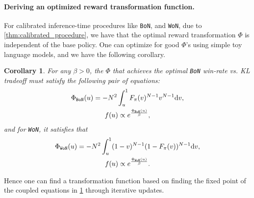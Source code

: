\documentclass{article}
\newcommand{\dd}{{\rm d}}
\newcommand{\reg}{\beta}
\newtheorem{corollary}{Corollary}
\newcommand{\bofn}{\texttt{BoN}\xspace}
\newcommand{\wofn}{\texttt{WoN}\xspace}
\begin{document}
%

%



%

%

\paragraph{Deriving an optimized reward transformation function.} %
For calibrated inference-time procedures like \bofn, and \wofn, due to \cref{thm:calibrated_procedure}, we have that the optimal reward transformation $\Phi$ is independent of the base policy. One can optimize for good $\Phi$'s using simple toy language models, and we have the following corollary.

\begin{corollary}  \label{cor:coupled_won}
 For any $\reg > 0$, the $\Phi$ that achieves the optimal \bofn win-rate vs.  KL tradeoff must satisfy the following pair of equations:
%
%
%
%
%
%
%
%
%
\begin{gather*}
    \Phi_{\bofn}(u) = -N^2 \int_u^1 F_{\pi}(v)^{N-1} v^{N-1} \dd v ,\\
    f(u) \propto e^\frac{\Phi_{\bofn}(u)}{\reg},
\end{gather*}
and for \wofn, it satisfies that
\begin{gather*}
    \Phi_{\wofn}(u)  =  -N^2 \int_u^1 (1-v)^{N-1} (1 - F_{\pi}(v))^{N-1} \dd v,\\
    f(u) \propto e^\frac{\Phi_{\wofn}(u)}{\reg}.
\end{gather*}
\end{corollary}
%
%
Hence one can find a transformation function based on finding the fixed point of the coupled equations in \cref{cor:coupled_won} through iterative updates.
\end{document}
